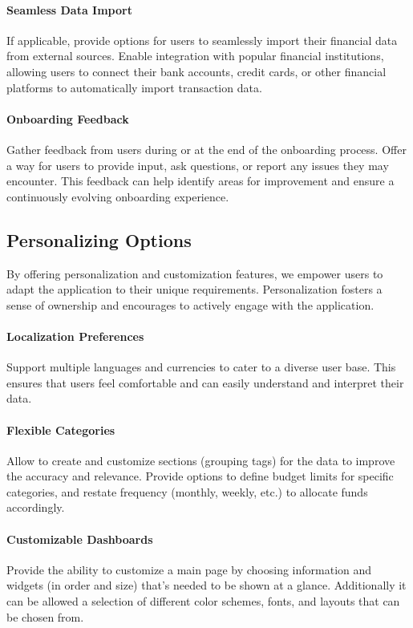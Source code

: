 \paragraph{Seamless Data Import}
If applicable, provide options for users to seamlessly import their financial data from external 
sources. Enable integration with popular financial institutions, allowing users to connect their bank accounts, credit 
cards, or other financial platforms to automatically import transaction data.

\paragraph{Onboarding Feedback}
Gather feedback from users during or at the end of the onboarding process. Offer a way for users 
to provide input, ask questions, or report any issues they may encounter. This feedback can help identify areas for 
improvement and ensure a continuously evolving onboarding experience.


\subsection{Personalizing Options}

By offering personalization and customization features, we empower users to adapt the application to their unique 
requirements. Personalization fosters a sense of ownership and encourages to actively engage with the application.

\paragraph{Localization Preferences}
Support multiple languages and currencies to cater to a diverse user base. This ensures that users feel comfortable and 
can easily understand and interpret their data.

\paragraph{Flexible Categories}
Allow to create and customize sections (grouping tags) for the data to improve the accuracy and relevance.
Provide options to define budget limits for specific categories, and restate frequency (monthly, weekly, etc.) to 
allocate funds accordingly.

\paragraph{Customizable Dashboards}
Provide the ability to customize a main page by choosing information and widgets (in order and size) that's needed to 
be shown at a glance. Additionally it can be allowed a selection of different color schemes, fonts, and layouts 
that can be chosen from.

